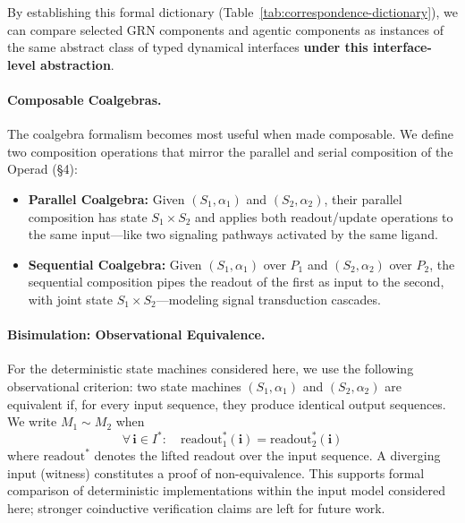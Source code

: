 By establishing this formal dictionary (Table~\ref{tab:correspondence-dictionary}), we can compare selected GRN components and agentic
components as instances of the same abstract class of typed dynamical interfaces \textbf{under this
interface-level abstraction}.

\paragraph{Composable Coalgebras.}
The coalgebra formalism becomes most useful when made composable. We define two composition operations that mirror the parallel and serial composition of the Operad (\S4):
\begin{itemize}[leftmargin=*]
\item \textbf{Parallel Coalgebra:} Given $(S_1, \alpha_1)$ and $(S_2, \alpha_2)$, their parallel composition has state $S_1 \times S_2$ and applies both readout/update operations to the same input---like two signaling pathways activated by the same ligand.
\item \textbf{Sequential Coalgebra:} Given $(S_1, \alpha_1)$ over $P_1$ and $(S_2, \alpha_2)$ over $P_2$, the sequential composition pipes the readout of the first as input to the second, with joint state $S_1 \times S_2$---modeling signal transduction cascades.
\end{itemize}

\paragraph{Bisimulation: Observational Equivalence.}
For the deterministic state machines considered here, we use the following observational criterion:
two state machines $(S_1, \alpha_1)$ and $(S_2, \alpha_2)$ are equivalent if, for every input sequence,
they produce identical output sequences. We write $M_1 \sim M_2$ when
\begin{equation}
\forall \, \mathbf{i} \in I^*: \quad \mathrm{readout}_1^*(\mathbf{i}) = \mathrm{readout}_2^*(\mathbf{i})
\label{eq:bisimulation}
\end{equation}
where $\mathrm{readout}^*$ denotes the lifted readout over the input sequence. A diverging input (witness) constitutes a proof of non-equivalence. This supports formal comparison of deterministic implementations within the input model considered here; stronger coinductive verification claims are left for future work.

